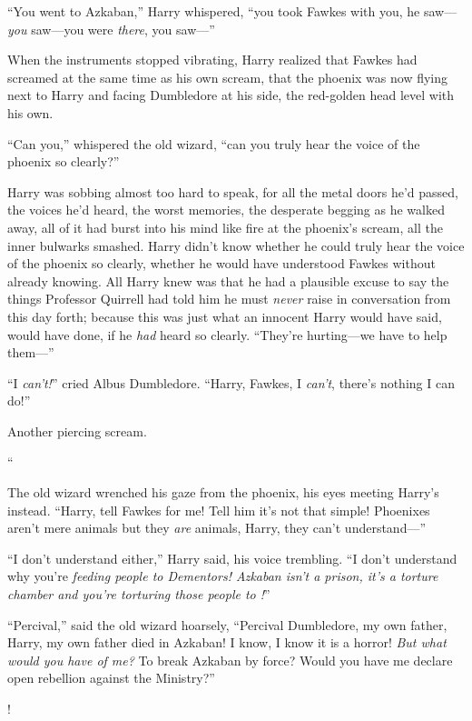 “You went to Azkaban,” Harry whispered, “you took Fawkes with you, he saw—\emph{you} saw—you were \emph{there}, you saw—”

When the instruments stopped vibrating, Harry realized that Fawkes had screamed at the same time as his own scream, that the phoenix was now flying next to Harry and facing Dumbledore at his side, the red-golden head level with his own.

“Can you,” whispered the old wizard, “can you truly hear the voice of the phoenix so clearly?”

Harry was sobbing almost too hard to speak, for all the metal doors he’d passed, the voices he’d heard, the worst memories, the desperate begging as he walked away, all of it had burst into his mind like fire at the phoenix’s scream, all the inner bulwarks smashed. Harry didn’t know whether he could truly hear the voice of the phoenix so clearly, whether he would have understood Fawkes without already knowing. All Harry knew was that he had a plausible excuse to say the things Professor Quirrell had told him he must \emph{never} raise in conversation from this day forth; because this was just what an innocent Harry would have said, would have done, if he \emph{had} heard so clearly. “They’re hurting—we have to help them—”

“I \emph{can’t!}” cried Albus Dumbledore. “Harry, Fawkes, I \emph{can’t}, there’s nothing I can do!”

Another piercing scream.

“

The old wizard wrenched his gaze from the phoenix, his eyes meeting Harry’s instead. “Harry, tell Fawkes for me! Tell him it’s not that simple! Phoenixes aren’t mere animals but they \emph{are} animals, Harry, they can’t understand—”

“I don’t understand either,” Harry said, his voice trembling. “I don’t understand why you’re \emph{feeding people to Dementors! Azkaban isn’t a prison, it’s a torture chamber and you’re torturing those people to !}”

“Percival,” said the old wizard hoarsely, “Percival Dumbledore, my own father, Harry, my own father died in Azkaban! I know, I know it is a horror! \emph{But what would you have of me?} To break Azkaban by force? Would you have me declare open rebellion against the Ministry?”

!

